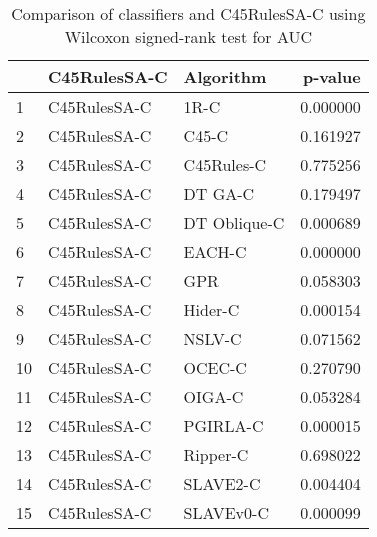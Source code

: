 \begin{table}
\footnotesize
\caption{Comparison of classifiers and C45RulesSA-C using Wilcoxon signed-rank test for AUC}
\label{tab:C45RulesSA-C wilcoxon AUC comparison}
\begin{tabular}{lllr}
\hline
 & C45RulesSA-C & Algorithm & p-value \\
\hline
1 & C45RulesSA-C & 1R-C & 0.000000 \\
2 & C45RulesSA-C & C45-C & 0.161927 \\
3 & C45RulesSA-C & C45Rules-C & 0.775256 \\
4 & C45RulesSA-C & DT GA-C & 0.179497 \\
5 & C45RulesSA-C & DT Oblique-C & 0.000689 \\
6 & C45RulesSA-C & EACH-C & 0.000000 \\
7 & C45RulesSA-C & GPR & 0.058303 \\
8 & C45RulesSA-C & Hider-C & 0.000154 \\
9 & C45RulesSA-C & NSLV-C & 0.071562 \\
10 & C45RulesSA-C & OCEC-C & 0.270790 \\
11 & C45RulesSA-C & OIGA-C & 0.053284 \\
12 & C45RulesSA-C & PGIRLA-C & 0.000015 \\
13 & C45RulesSA-C & Ripper-C & 0.698022 \\
14 & C45RulesSA-C & SLAVE2-C & 0.004404 \\
15 & C45RulesSA-C & SLAVEv0-C & 0.000099 \\
\hline
\end{tabular}
\end{table}
